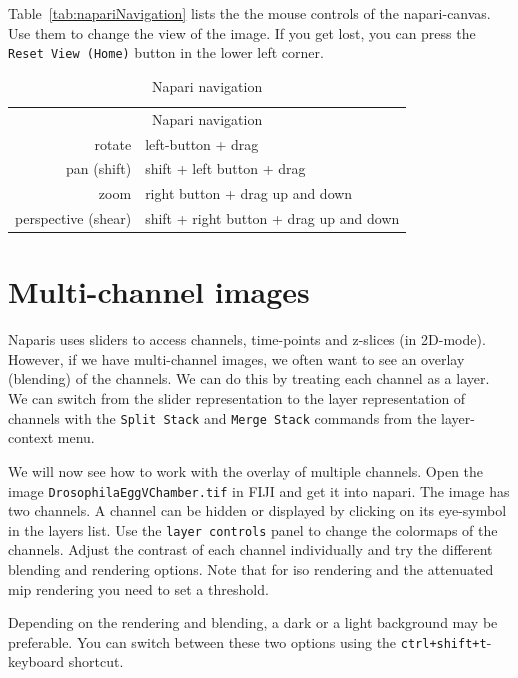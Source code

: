 Table~\ref{tab:napariNavigation} lists the the mouse controls of the napari-canvas. Use them to change the view of the image. If you get lost, you can press the {\tt Reset View (Home)} button in the lower left corner.

\begin{table}[ht]
\caption{Napari navigation}
\label{tab:napariNavigation}
\begin{center}
\begin{tabular}{rl}
    \hline
    \multicolumn{2}{c}{Napari navigation}\\
    rotate & left-button + drag \\
    pan (shift) & shift + left button + drag\\
    zoom &  right button + drag up and down  \\
    perspective (shear) & shift + right button + drag up and down\\    
    \hline
\end{tabular}
\end{center}
\label{tab:multicol}
\end{table}

\section{Multi-channel images}

Naparis uses sliders to access channels, time-points and z-slices (in 2D-mode). However, if we have multi-channel images, we often want to see an overlay (blending) of the channels. We can do this by treating each channel as a layer. We can switch from the slider representation to the layer representation of channels with the {\tt Split Stack} and {\tt Merge Stack} commands from the layer-context menu. 

We will now see how to work with the overlay of multiple channels. Open the image {\tt DrosophilaEggVChamber.tif}\cite{sarah_machado_2018_1472859} in FIJI and get it into napari. The image has two channels. A channel can be hidden or displayed by clicking on its eye-symbol in the layers list. Use the {\tt layer controls} panel to change the colormaps of the channels. Adjust the contrast of each channel individually and try the different blending and rendering options. Note that for iso rendering and the attenuated mip rendering you need to set a threshold. 

Depending on the rendering and blending, a dark or a light background may be preferable. You can switch between these two options using the {\tt ctrl+shift+t}-keyboard shortcut.

